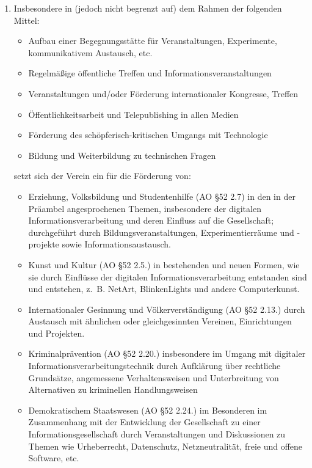 ﻿\documentclass[10pt,a4paper]{scrartcl}
\begin{document}
\begin{enumerate}
\item Insbesondere in (jedoch nicht begrenzt auf) dem Rahmen der folgenden Mittel:
	\begin{itemize}
                \item Aufbau einer Begegnungsstätte für Veranstaltungen, Experimente, kommunikativem Austausch, etc.
		\item Regelmäßige öffentliche Treffen und Informationsveranstaltungen
		\item Veranstaltungen und/oder Förderung internationaler Kongresse, Treffen
		\item Öffentlichkeitsarbeit und Telepublishing in allen Medien
		\item Förderung des schöpferisch-kritischen Umgangs mit Technologie
                \item Bildung und Weiterbildung zu technischen Fragen
	\end{itemize}
	setzt sich der Verein ein für die Förderung von:
	\begin{itemize}
		\item Erziehung, Volksbildung und Studentenhilfe (AO §52 2.7) in den in der Präambel angesprochenen Themen,
			insbesondere der digitalen Informationsverarbeitung und deren Einfluss auf die Gesellschaft;
			durchgeführt durch Bildungsveranstaltungen, Experimentierräume und -projekte sowie Informationsaustausch.
		\item Kunst und Kultur (AO §52 2.5.) in bestehenden und neuen Formen, wie sie durch Einflüsse der digitalen
			Informationsverarbeitung entstanden sind und entstehen, z.\, B. NetArt, BlinkenLights und andere Computerkunst.
                \item Internationaler Gesinnung und Völkerverständigung (AO §52 2.13.) durch Austausch mit ähnlichen oder gleichgesinnten
			Vereinen, Einrichtungen und Projekten.
		\item Kriminalprävention (AO §52 2.20.) insbesondere im Umgang mit digitaler Informationsverarbeitungstechnik durch
			Aufklärung über rechtliche Grundsätze, angemessene Verhaltensweisen und Unterbreitung von Alternativen zu 
			kriminellen Handlungsweisen
		\item Demokratischem Staatswesen (AO §52 2.24.) im Besonderen im Zusammenhang mit der Entwicklung der Gesellschaft 
			zu einer Informationsgesellschaft durch Veranstaltungen und Diskussionen zu Themen wie Urheberrecht, Datenschutz, 
			Netzneutralität, freie und offene Software, etc.
	\end{itemize}
\end{enumerate}
%
%
\end{document}
